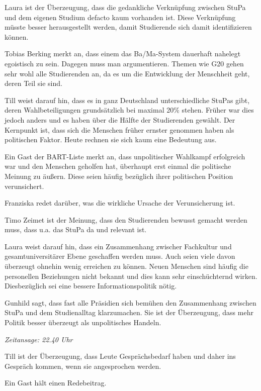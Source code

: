 \documentclass[ngerman,headheight=70pt]{scrartcl}
\begin{document}
    Laura ist der Überzeugung, dass die gedankliche Verknüpfung zwischen StuPa
    und dem eigenen Studium defacto kaum vorhanden ist. Diese Verknüpfung müsste
    besser herausgestellt werden, damit Studierende sich damit identifizieren können.

    Tobias Berking merkt an, dass einem das Ba/Ma-System dauerhaft nahelegt
    egoistisch zu sein. Dagegen muss man argumentieren. Themen wie G20 gehen sehr
    wohl alle Studierenden an, da es um die Entwicklung der Menschheit geht, deren
    Teil sie sind.

    Till weist darauf hin, dass es in ganz Deutschland unterschiedliche StuPas gibt,
    deren Wahlbeteiligungen grundsätzlich bei maximal 20\% stehen. Früher war dies
    jedoch anders und es haben über die Hälfte der Studierenden gewählt.
    Der Kernpunkt ist, dass sich die Menschen früher ernster genommen haben als
    politischen Faktor. Heute rechnen sie sich kaum eine Bedeutung aus.

    Ein Gast der BART-Liste merkt an, dass unpolitischer Wahlkampf erfolgreich war
    und den Menschen geholfen hat, überhaupt erst einmal die politische Meinung
    zu äußern. Diese seien häufig bezüglich ihrer politischen Position verunsichert.

    Franziska redet darüber, was die wirkliche Ursache der Verunsicherung ist.

    Timo Zeimet ist der Meinung, dass den Studierenden bewusst gemacht werden muss,
    dass u.a. das StuPa da und relevant ist.

    Laura weist darauf hin, dass ein Zusammenhang zwischer Fachkultur und
    gesamtuniversitärer Ebene geschaffen werden muss. Auch seien viele davon überzeugt
    ohnehin wenig erreichen zu können. Neuen Menschen sind häufig die personellen
    Beziehungen nicht bekannt und dies kann sehr einschüchternd wirken.
    Diesbezüglich sei eine bessere Informationspolitik nötig.

    Gunhild sagt, dass fast alle Präsidien sich bemühen den Zusammenhang zwischen
    StuPa und dem Studienalltag klarzumachen. Sie ist der Überzeugung, dass
    mehr Politik besser überzeugt als unpolitisches Handeln.

    \textit{Zeitansage: 22.40 Uhr}

    Till ist der Überzeugung, dass Leute Gesprächsbedarf haben und daher ins
    Gespräch kommen, wenn sie angesprochen werden.

    Ein Gast hält einen Redebeitrag.
\end{document}
